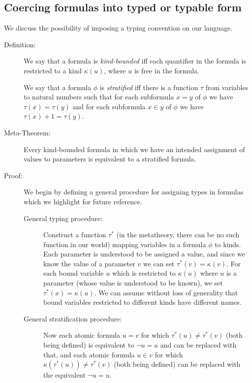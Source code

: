 \documentclass[12pt]{article}
\begin{document}
\subsection{Coercing formulas into typed or typable form}

We discuss the possibility of imposing a typing convention on our language.

\begin{description}

\item[Definition:]  We say that a formula is {\em kind-bounded\/} iff each quantifier in the formula is restricted to a kind $\kappa(u)$, where $u$ is free in the formula.

We say that a formula $\phi$ is {\em stratified\/} iff there is a function $\tau$ from variables to natural numbers such that for each subformula  $x=y$ of $\phi$ we have $\tau(x)=\tau(y)$ and for each subformula $x \in y$ of $\phi$ we have $\tau(x)+1 = \tau(y)$.

\item[Meta-Theorem:]  Every kind-bounded formula in which we have an intended assignment of values to parameters is equivalent to a stratified formula.

\item[Proof:]  We begin by defining a general procedure for assigning types in formulas which we highlight for future reference.
\begin{description}

\item [General typing procedure:]  Construct a function $\tau^*$ (in the metatheory, there can be no such function in our world) mapping variables in a formula $\phi$ to kinds.  Each parameter is understood to be assigned a value, and since we know the value of a parameter $v$ we can set $\tau^*(v) = \kappa(v)$.  For each bound variable $u$ which is restricted to $\kappa(u)$ where
$u$ is a parameter (whose value is understood to be known),  we set $\tau^*(x)=\kappa(u)$.  We can assume without loss of generality that bound variables restricted to different kinds have different names. 

\item[General stratification procedure:]

Now each atomic formula $u=v$ for which $\tau^*(u)\neq \tau^*(v)$ (both being defined) is equivalent to \newline $\neg u=u$ and can be replaced with that, and each atomic formula $u \in v$ for which $\kappa(\tau^*(u)) \neq \tau^*(v)$ (both being defined) can be replaced with the equivalent $\neg u=u$. 
\end{description}




\end{description}
\end{document}
